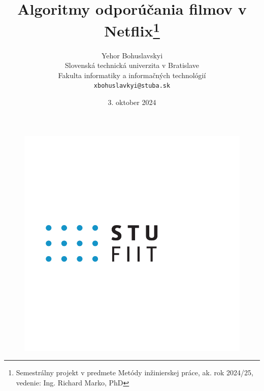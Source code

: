 \documentclass[10pt,twoside,slovak,a4paper]{article}
\title{Algoritmy odporúčania filmov v Netflix\thanks{Semestrálny projekt v predmete Metódy inžinierskej práce, ak. rok 2024/25, vedenie: Ing. Richard Marko, PhD}}
\author{Yehor Bohuslavskyi\\[2pt]
	{\small Slovenská technická univerzita v Bratislave}\\
	{\small Fakulta informatiky a informačných technológií}\\
	{\small \texttt{xbohuslavkyi@stuba.sk}}
	}
\date{\small 3. oktober 2024}
\begin{document}
\begin{figure}[h!]
  \centering
  \includegraphics[width=\textwidth]{Images/fiit_logo.png} 
\end{figure}

\maketitle
\end{document}
